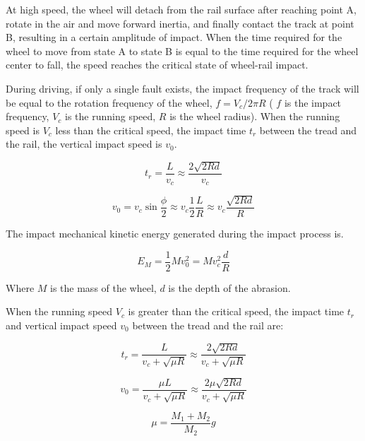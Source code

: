 \documentclass{article}
\begin{document}
At high speed, the wheel will detach from the rail surface after reaching point A, rotate in the air and move forward inertia, and finally contact the track at point B, resulting in a certain amplitude of impact. When the time required for the wheel to move from state A to state B is equal to the time required for the wheel center to fall, the speed reaches the critical state of wheel-rail impact.

During driving, if only a single fault exists, the impact frequency of the track will be equal to the rotation frequency of the wheel, $f = V_c / 2 \pi R$ ( $f$ is the impact frequency, $V_c$ is the running speed, $R$ is the wheel radius). When the running speed is $V_c$ less than the critical speed, the impact time $t_r$ between the tread and the rail, the vertical impact speed is $v_0$.

\begin{equation}
    t_r = \frac{L}{v_c} \approx \frac{2 \sqrt{2 R d}}{v_c}
    \label{eq:2.21}
\end{equation}

\begin{equation}
    v_0 = v_c \sin \frac{\phi}{2} \approx v_c \frac{1}{2} \frac{L}{R} \approx v_c \frac{\sqrt{2 R d}}{R}
    \label{eq:2.22}
\end{equation}

The impact mechanical kinetic energy generated during the impact process is.

\begin{equation}
    E_M = \frac{1}{2} M v_0^2 = M v_c^2 \frac{d}{R}
    \label{eq:2.23}
\end{equation}

Where $M$ is the mass of the wheel, $d$ is the depth of the abrasion.

When the running speed $V_c$ is greater than the critical speed, the impact time $t_r$ and vertical impact speed $v_0$ between the tread and the rail are:

\begin{equation}
    t_r = \frac{L}{v_c + \sqrt{\mu R}} \approx \frac{2 \sqrt{2 R d}}{v_c + \sqrt{\mu R}}
    \label{eq:2.24}
\end{equation}

\begin{equation}
    v_0 = \frac{\mu L}{v_c + \sqrt{\mu R}} \approx \frac{2 \mu \sqrt{2 R d}}{v_c + \sqrt{\mu R}}
    \label{eq:2.25}    
\end{equation}

\begin{equation}
    \mu = \frac{M_1 + M_2}{M_2} g
    \label{eq:2.26}    
\end{equation}
\end{document}
